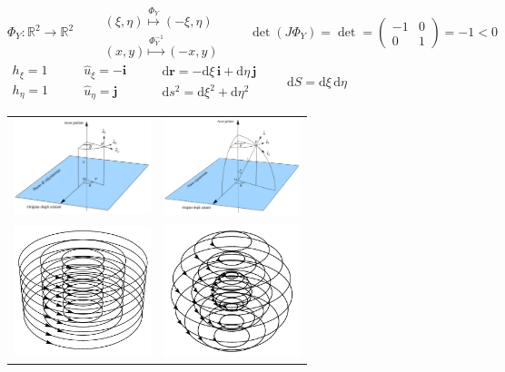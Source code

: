 \documentclass[10pt,landscape]{article}
\begin{document}
\begin{multicols*}{2}
$\Phi_Y:\mathbb{R}^2\longrightarrow\mathbb{R}^2\qquad
\begin{array}{l}(\xi,\eta)\overset{\Phi_Y}{\mapsto}(-\xi,\eta)\\(x,y)\overset{\Phi_Y^{-1}}{\mapsto}(-x,y)\end{array}\qquad
\det(J\Phi_Y)=\det=\left(\begin{matrix}-1&0\\0&1\end{matrix}\right)=-1<0$\\
$\begin{array}{l}h_\xi=1\\h_\eta=1\end{array}\qquad
\begin{array}{l}\hat u_\xi=-\mathbf i\\\hat u_\eta=\mathbf j\end{array}\qquad
\begin{array}{l}\mathrm{d}\mathbf r=-\mathrm{d}\xi\,\mathbf i+\mathrm{d}\eta\,\mathbf j\\\mathrm{d}s^2=\mathrm{d}\xi^2+\mathrm{d}\eta^2\end{array}\qquad
\mathrm{d}S=\mathrm{d}\xi\,\mathrm{d}\eta$\\
\;\;\;\;\;\;\;\;\;
\begin{tabular}{c c}
\includegraphics[width=4cm]{cyl}&\includegraphics[width=4cm]{sph}\\
\includegraphics[width=4cm]{c1cyl}&\includegraphics[width=4cm]{c1sph}\\

\end{tabular}
\end{multicols*}
\end{document}
